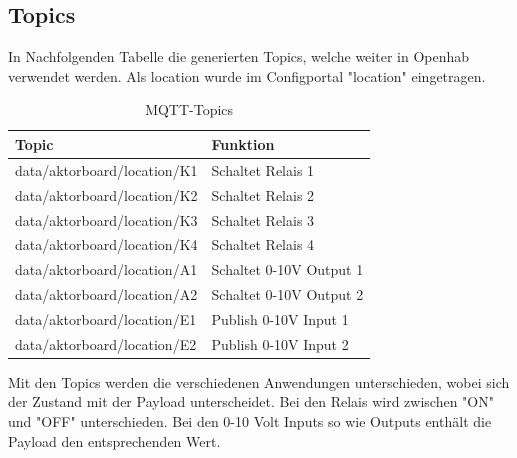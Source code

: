 \subsection{Topics}
In Nachfolgenden Tabelle die generierten Topics, welche weiter in Openhab verwendet werden. Als location wurde im Configportal "location" eingetragen.
\begin{table}[H]
	\centering
	\begin{tabular}{|l|l|}
		\hline 
		 Topic  & Funktion  \\ 
		\hline 
		data/aktorboard/location/K1 & Schaltet Relais 1  \\ 
		\hline
		data/aktorboard/location/K2 & Schaltet Relais 2  \\ 
		\hline
		data/aktorboard/location/K3 & Schaltet Relais 3  \\ 
		\hline
		data/aktorboard/location/K4 & Schaltet Relais 4  \\ 
		\hline 
		data/aktorboard/location/A1 & Schaltet 0-10V Output 1  \\ 
		\hline
		data/aktorboard/location/A2 & Schaltet 0-10V Output 2  \\ 
		\hline
		data/aktorboard/location/E1 & Publish 0-10V Input 1  \\ 
		\hline
		data/aktorboard/location/E2 & Publish 0-10V Input 2  \\ 
		\hline
	\end{tabular} 	
\label{tab: MQTT-Topics Aktor}
\caption{MQTT-Topics}
\end{table}
 
 Mit den Topics werden die verschiedenen Anwendungen unterschieden, wobei sich der Zustand mit der Payload unterscheidet. Bei den Relais wird zwischen "ON" und "OFF" unterschieden. Bei den 0-10 Volt Inputs so wie Outputs enthält die Payload den entsprechenden Wert. 

